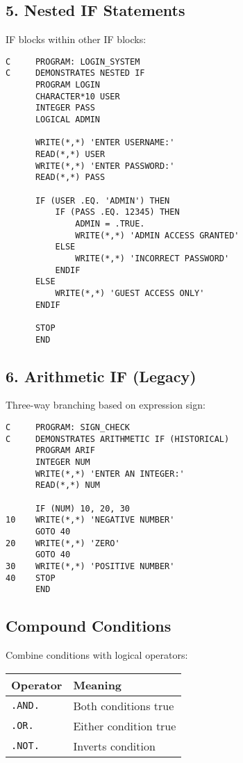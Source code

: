 \documentclass{book}
\begin{document}
\subsection*{5. Nested IF Statements}
IF blocks within other IF blocks:
\begin{verbatim}
C     PROGRAM: LOGIN_SYSTEM
C     DEMONSTRATES NESTED IF
      PROGRAM LOGIN
      CHARACTER*10 USER
      INTEGER PASS
      LOGICAL ADMIN
      
      WRITE(*,*) 'ENTER USERNAME:'
      READ(*,*) USER
      WRITE(*,*) 'ENTER PASSWORD:'
      READ(*,*) PASS
      
      IF (USER .EQ. 'ADMIN') THEN
          IF (PASS .EQ. 12345) THEN
              ADMIN = .TRUE.
              WRITE(*,*) 'ADMIN ACCESS GRANTED'
          ELSE
              WRITE(*,*) 'INCORRECT PASSWORD'
          ENDIF
      ELSE
          WRITE(*,*) 'GUEST ACCESS ONLY'
      ENDIF
      
      STOP
      END
\end{verbatim}

\subsection*{6. Arithmetic IF (Legacy)}
Three-way branching based on expression sign:
\begin{verbatim}
C     PROGRAM: SIGN_CHECK
C     DEMONSTRATES ARITHMETIC IF (HISTORICAL)
      PROGRAM ARIF
      INTEGER NUM
      WRITE(*,*) 'ENTER AN INTEGER:'
      READ(*,*) NUM
      
      IF (NUM) 10, 20, 30
10    WRITE(*,*) 'NEGATIVE NUMBER'
      GOTO 40
20    WRITE(*,*) 'ZERO'
      GOTO 40
30    WRITE(*,*) 'POSITIVE NUMBER'
40    STOP
      END
\end{verbatim}

\subsection*{Compound Conditions}
Combine conditions with logical operators:
\begin{center}
\begin{tabular}{|l|l|}
\hline
\textbf{Operator} & \textbf{Meaning} \\ 
\hline
\texttt{.AND.} & Both conditions true \\
\texttt{.OR.} & Either condition true \\
\texttt{.NOT.} & Inverts condition \\
\hline
\end{tabular}
\end{center}
\end{document}
